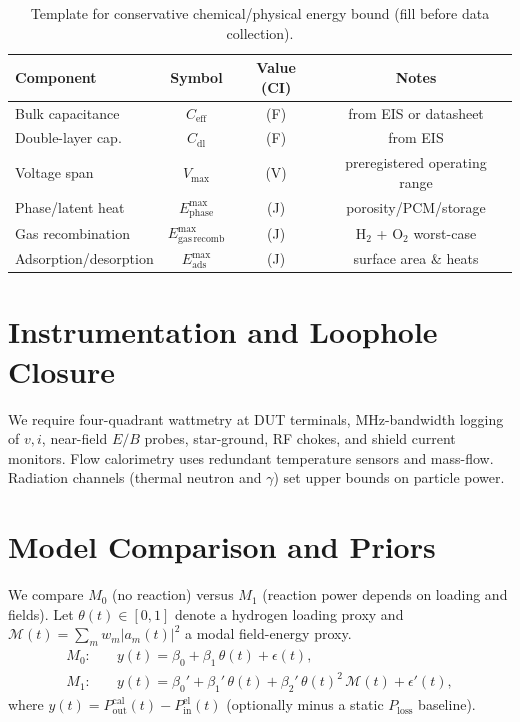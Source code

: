 \documentclass[11pt]{article}
\theoremstyle{remark}
\begin{document}
\begin{table}[h]
\centering
\caption{Template for conservative chemical/physical energy bound (fill before data collection).}
\label{tab:chem}
\begin{tabular}{lccc}
\toprule
Component & Symbol & Value (CI) & Notes \\
\midrule
Bulk capacitance & $C_{\mathrm{eff}}$ & (\si{F}) & from EIS or datasheet \\
Double-layer cap. & $C_{\mathrm{dl}}$ & (\si{F}) & from EIS \\
Voltage span & $V_{\max}$ & (\si{V}) & preregistered operating range \\
Phase/latent heat & $E_{\mathrm{phase}}^{\max}$ & (\si{J}) & porosity/PCM/storage \\
Gas recombination & $E_{\mathrm{gas\,recomb}}^{\max}$ & (\si{J}) & H$_2$ + O$_2$ worst-case \\
Adsorption/desorption & $E_{\mathrm{ads}}^{\max}$ & (\si{J}) & surface area \& heats \\
\bottomrule
\end{tabular}
\end{table}

\section{Instrumentation and Loophole Closure}
We require four-quadrant wattmetry at DUT terminals, MHz-bandwidth logging of $v,i$, near-field $E/B$ probes, star-ground, RF chokes, and shield current monitors. Flow calorimetry uses redundant temperature sensors and mass-flow. Radiation channels (thermal neutron and $\gamma$) set upper bounds on particle power.

\section{Model Comparison and Priors}
\label{sec:model}
We compare $M_0$ (no reaction) versus $M_1$ (reaction power depends on loading and fields). Let $\theta(t)\in[0,1]$ denote a hydrogen loading proxy and $\mathcal{M}(t)=\sum_m w_m |a_m(t)|^2$ a modal field-energy proxy.
\begin{align}
M_0:&\quad y(t) = \beta_0 + \beta_1\,\theta(t) + \epsilon(t), \\
M_1:&\quad y(t) = \beta_0' + \beta_1'\,\theta(t) + \beta_2'\,\theta(t)^2\,\mathcal{M}(t) + \epsilon'(t),
\end{align}
where $y(t)=P_{\mathrm{out}}^{\mathrm{cal}}(t) - P_{\mathrm{in}}^{\mathrm{el}}(t)$ (optionally minus a static $P_{\mathrm{loss}}$ baseline).
\end{document}
